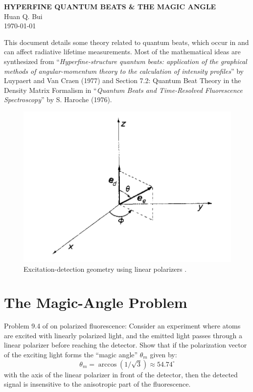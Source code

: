 \documentclass[11pt]{article}
\begin{document}
\begin{center}
\textbf{HYPERFINE QUANTUM BEATS \& THE MAGIC ANGLE}\\

Huan Q. Bui\\
\today
\end{center}

This document details some theory related to quantum beats, which occur in and can affect radiative lifetime measurements. Most of the mathematical ideas are synthesized from ``\textit{Hyperfine-structure quantum beats: application of the graphical methods of angular-momentum theory to the calculation of intensity profiles}'' by Luypaert and Van Craen (1977) and Section 7.2: Quantum Beat Theory in the Density Matrix Formalism in ``\textit{Quantum Beats and Time-Resolved Fluorescence Spectroscopy}'' by S. Haroche (1976).


\begin{figure}[!htb]
	\centering
	\includegraphics[scale=0.7]{beats_1}
	\caption{ Excitation-detection geometry using linear polarizers \cite{Luypaert_1977}.}
	\label{fig:scheme}
\end{figure}




\section{The Magic-Angle Problem}
Problem 9.4 of \cite{demille_atoms} on polarized fluorescence: Consider an experiment where atoms are excited with linearly polarized light, and the emitted light passes through a linear polarizer before reaching the detector. Show that if the polarization vector of the exciting light forms the ``magic angle'' $\theta_m$ given by:
\begin{equation*}
\theta_m = \arccos(1/\sqrt{3}) \approx 54.74^\circ
\end{equation*}
with the axis of the linear polarizer in front of the detector, then the detected signal is insensitive to the anisotropic part of the fluorescence. 
\end{document}
